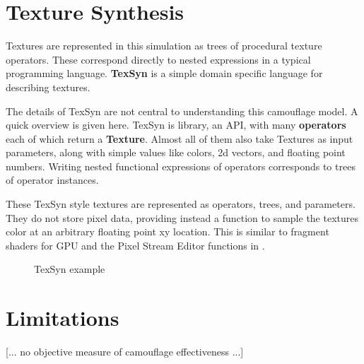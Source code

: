 \documentclass[sigconf]{acmart}
\begin{document}
\section{Texture Synthesis}
Textures are represented in this simulation as trees of procedural texture operators. These correspond directly to nested expressions in a typical programming language. \textbf{TexSyn} is a simple domain specific language for describing textures.
\par
The details of TexSyn are not central to understanding this camouflage model. A quick overview is given here. TexSyn is library, an API, with many \textbf{operators} each of which return a \textbf{Texture}. Almost all of them also take Textures as input parameters, along with simple values like colors, 2d vectors, and floating point numbers. Writing nested functional expressions of operators corresponds to trees of operator instances.
\par
These TexSyn style textures are represented as operators, trees, and parameters. They do not store pixel data, providing instead a function to sample the textures color at an arbitrary floating point xy location. This is similar to fragment shaders for GPU and the Pixel Stream Editor functions in \cite{perlin_image_1985}.
\par
\begin{figure}
\centering
\missingfigure[figwidth=\linewidth*0.5,figcolor=white]{}
\caption{TexSyn example}
\end{figure}

\section{Limitations}
[... no objective measure of camouflage effectiveness ...]
\par
[... all results are hand selected, “cherry picked” ...] 
\par
[... cite that fast growing literature on “camouflaged object detection” ...]
\par
[... propose a crowd sourced user study of camouflage quality ... could be based on time to find ... like the interactive web games of \href{https://www.visual-ecology.com/2020/10/06/martin-stevens/}{Martin Stevens} nuthatch egg? ...] 
\par
[... in email to Ken I wrote: \textit{The aspect of my project I'm unsure how to approach is lack of rigor. My evaluations are all subjective. It comes down to “we can see that the effectiveness of the camouflage clearly increases during the simulation.”}]
\par
[... inherently 2d ...]
\par
[... texture synthesis lacks genetic or biological plausibility ...]
\end{document}
